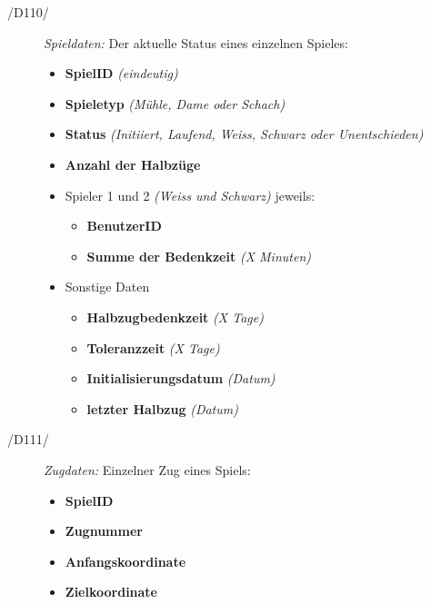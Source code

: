 \begin{description}
  \item[/D110/]
    \textit{Spieldaten:} Der aktuelle Status eines einzelnen Spieles:
    \begin{itemize}
      \item \textbf{SpielID} \textit{(eindeutig)}
      \item \textbf{Spieletyp} \textit{(Mühle, Dame oder Schach)}
      \item \textbf{Status} \textit{(Initiiert, Laufend, Weiss, Schwarz oder Unentschieden)}
      \item \textbf{Anzahl der Halbzüge}
      \item Spieler 1 und 2 \textit{(Weiss und Schwarz)} jeweils:
        \begin{itemize}
          \item \textbf{BenutzerID}
          \item \textbf{Summe der Bedenkzeit} \textit{(X Minuten)}
        \end{itemize}
      \item Sonstige Daten
        \begin{itemize}
          \item \textbf{Halbzugbedenkzeit} \textit{(X Tage)}
          \item \textbf{Toleranzzeit} \textit{(X Tage)}
          \item \textbf{Initialisierungsdatum} \textit{(Datum)}
          \item \textbf{letzter Halbzug} \textit{(Datum)}
        \end{itemize}
    \end{itemize}
\end{description}

\begin{description}
  \item[/D111/]
    \textit{Zugdaten:} Einzelner Zug eines Spiels:
    \begin{itemize}
      \item \textbf{SpielID}
      \item \textbf{Zugnummer}
      \item \textbf{Anfangskoordinate}
      \item \textbf{Zielkoordinate}
    \end{itemize}
\end{description}
